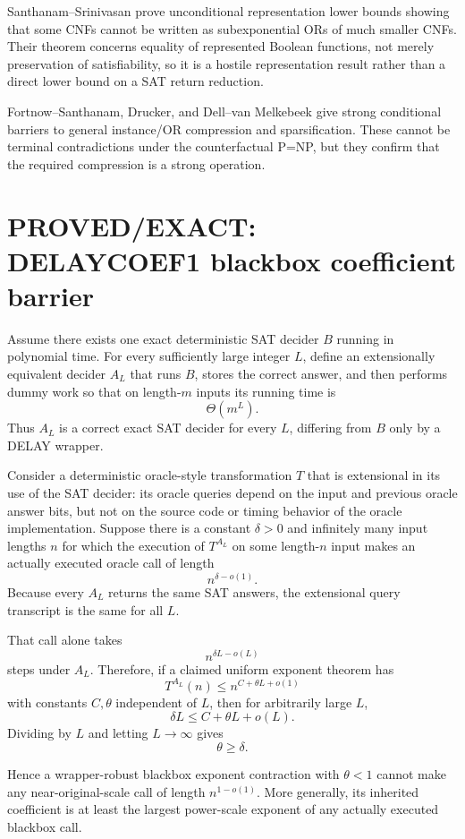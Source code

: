 \documentclass[11pt]{article}
\begin{document}
Santhanam--Srinivasan prove unconditional representation lower bounds showing that some CNFs cannot be written as subexponential ORs of much smaller CNFs. Their theorem concerns equality of represented Boolean functions, not merely preservation of satisfiability, so it is a hostile representation result rather than a direct lower bound on a SAT return reduction.

Fortnow--Santhanam, Drucker, and Dell--van Melkebeek give strong conditional barriers to general instance/OR compression and sparsification. These cannot be terminal contradictions under the counterfactual P=NP, but they confirm that the required compression is a strong operation.

\section*{PROVED/EXACT: DELAYCOEF1 blackbox coefficient barrier}
Assume there exists one exact deterministic SAT decider \(B\) running in polynomial time. For every sufficiently large integer \(L\), define an extensionally equivalent decider \(A_L\) that runs \(B\), stores the correct answer, and then performs dummy work so that on length-\(m\) inputs its running time is
\[
\Theta(m^L).
\]
Thus \(A_L\) is a correct exact SAT decider for every \(L\), differing from \(B\) only by a DELAY wrapper.

Consider a deterministic oracle-style transformation \(T\) that is extensional in its use of the SAT decider: its oracle queries depend on the input and previous oracle answer bits, but not on the source code or timing behavior of the oracle implementation. Suppose there is a constant \(\delta>0\) and infinitely many input lengths \(n\) for which the execution of \(T^{A_L}\) on some length-\(n\) input makes an actually executed oracle call of length
\[
n^{\delta-o(1)}.
\]
Because every \(A_L\) returns the same SAT answers, the extensional query transcript is the same for all \(L\).

That call alone takes
\[
n^{\delta L-o(L)}
\]
steps under \(A_L\). Therefore, if a claimed uniform exponent theorem has
\[
T^{A_L}(n)\le n^{C+\theta L+o(1)}
\]
with constants \(C,\theta\) independent of \(L\), then for arbitrarily large \(L\),
\[
\delta L\le C+\theta L+o(L).
\]
Dividing by \(L\) and letting \(L\to\infty\) gives
\[
\boxed{\theta\ge\delta.}
\]

Hence a wrapper-robust blackbox exponent contraction with \(\theta<1\) cannot make any near-original-scale call of length \(n^{1-o(1)}\). More generally, its inherited coefficient is at least the largest power-scale exponent of any actually executed blackbox call.
\end{document}
